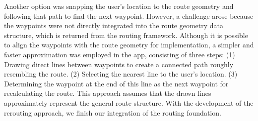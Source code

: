 Another option was snapping the user's location to the route geometry and following that path to find the next waypoint. However, a challenge arose because the waypoints were not directly integrated into the route geometry data structure, which is returned from the routing framework. Although it is possible to align the waypoints with the route geometry for implementation, a simpler and faster approximation was employed in the app, consisting of three steps: (1) Drawing direct lines between waypoints to create a connected path roughly resembling the route. (2) Selecting the nearest line to the user's location. (3) Determining the waypoint at the end of this line as the next waypoint for recalculating the route. This approach assumes that the drawn lines approximately represent the general route structure. With the development of the rerouting approach, we finish our integration of the routing foundation.

